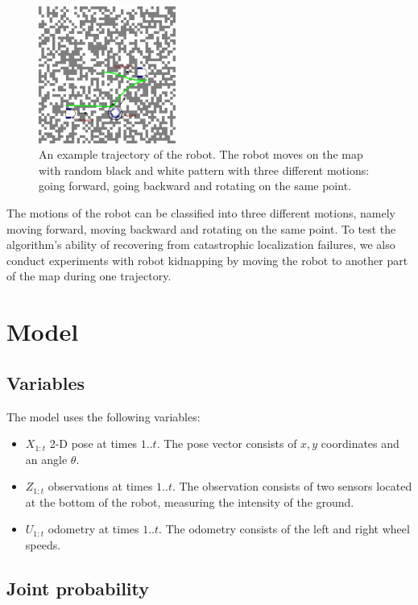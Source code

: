 \documentclass[letterpaper, 10pt, conference]{ieeeconf}
\begin{document}
\begin{figure}
\begin{center}
\includegraphics[width=0.4\textwidth]{dataset}
\caption{An example trajectory of the robot. The robot moves on the map with random black and white pattern with three different motions: going forward, going backward and rotating on the same point.}
\label{fig:dataset}
\end{center}
\end{figure}

The motions of the robot can be classified into three different motions, namely moving forward, moving backward and rotating on the same point. 
To test the algorithm's ability of recovering from catastrophic localization failures, we also conduct experiments with robot kidnapping by moving the robot to another part of the map during one trajectory.  
\section{Model}

\subsection{Variables}

The model uses the following variables:
\begin{itemize}
\item $X_{1:t}$ 2-D pose at times $1..t$.
The pose vector consists of $x,y$ coordinates and an angle $\theta$.
\item $Z_{1:t}$ observations at times $1..t$.
The observation consists of two sensors located at the bottom of the robot, measuring the intensity of the ground.
\item $U_{1:t}$ odometry at times $1..t$.
The odometry consists of the left and right wheel speeds.
\end{itemize}

\subsection{Joint probability}
\end{document}
